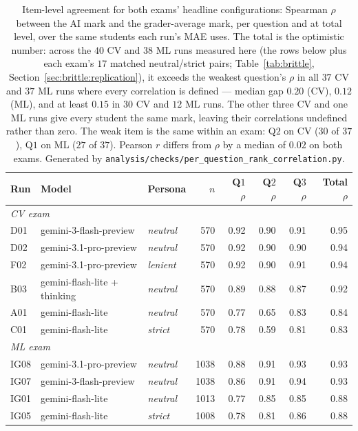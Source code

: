 \begin{table}[t]
\centering
\caption{Item-level agreement for both exams' headline configurations: Spearman $\rho$ between the AI mark and the grader-average mark, per question and at total level, over the same students each run's MAE uses. The total is the optimistic number: across the $40$ CV and $38$ ML runs measured here (the rows below plus each exam's $17$ matched neutral/strict pairs; Table~\ref{tab:brittle}, Section~\ref{sec:brittle:replication}), it exceeds the weakest question's $\rho$ in all $37$ CV and $37$ ML runs where every correlation is defined --- median gap $0.20$ (CV), $0.12$ (ML), and at least $0.15$ in $30$ CV and $12$ ML runs. The other three CV and one ML runs give every student the same mark, leaving their correlations undefined rather than zero. The weak item is the same within an exam: Q$2$ on CV ($30$ of $37$), Q$1$ on ML ($27$ of $37$). Pearson $r$ differs from $\rho$ by a median of $0.02$ on both exams. Generated by \texttt{analysis/checks/per\_question\_rank\_correlation.py}.}
\label{tab:itemcorr}
\small
\begin{tabular}{lllrrrrr}
\toprule
Run & Model & Persona & $n$ & Q$1$ $\rho$ & Q$2$ $\rho$ & Q$3$ $\rho$ & Total $\rho$ \\
\midrule
\multicolumn{8}{l}{\emph{CV exam}} \\
D01 & gemini-3-flash-preview & \emph{neutral} & 570 & 0.92 & 0.90 & 0.91 & 0.95 \\
D02 & gemini-3.1-pro-preview & \emph{neutral} & 570 & 0.92 & 0.90 & 0.90 & 0.94 \\
F02 & gemini-3.1-pro-preview & \emph{lenient} & 570 & 0.92 & 0.90 & 0.91 & 0.94 \\
B03 & gemini-flash-lite + thinking & \emph{neutral} & 570 & 0.89 & 0.88 & 0.87 & 0.92 \\
A01 & gemini-flash-lite & \emph{neutral} & 570 & 0.77 & 0.65 & 0.83 & 0.84 \\
C01 & gemini-flash-lite & \emph{strict} & 570 & 0.78 & 0.59 & 0.81 & 0.83 \\
\midrule
\multicolumn{8}{l}{\emph{ML exam}} \\
IG08 & gemini-3.1-pro-preview & \emph{neutral} & 1038 & 0.88 & 0.91 & 0.93 & 0.93 \\
IG07 & gemini-3-flash-preview & \emph{neutral} & 1038 & 0.86 & 0.91 & 0.94 & 0.93 \\
IG01 & gemini-flash-lite & \emph{neutral} & 1013 & 0.77 & 0.85 & 0.85 & 0.88 \\
IG05 & gemini-flash-lite & \emph{strict} & 1008 & 0.78 & 0.81 & 0.86 & 0.88 \\
\bottomrule
\end{tabular}
\end{table}

